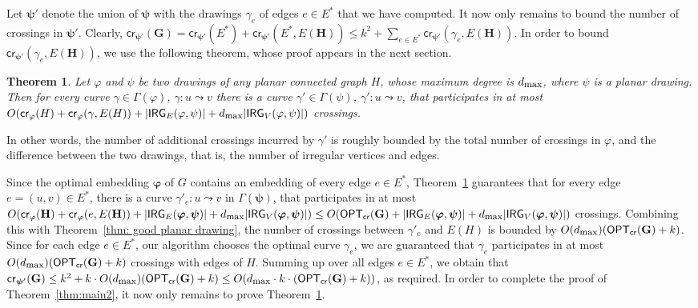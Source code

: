 \documentclass[twoside,leqno,twocolumn]{article}
\newcommand{\connect}{\leadsto}
\newtheorem{theorem}{Theorem}
\renewcommand{\phi}{\varphi}
\newcommand{\optcro}[1]{\mathsf{OPT}_{\mathsf{cr}}(#1)}
\newcommand{\cro}{\mathsf{cr}}
\newcommand{\irreg}{\mathsf{IRG}}
\newcommand{\dmax}{d_{\mbox{\textup{\footnotesize{max}}}}}
\newcommand{\G}{{\mathbf{G}}}
\renewcommand{\H}{{\mathbf{H}}}
\newcommand{\bphi}{{\boldsymbol{\varphi}}}
\newcommand{\bpsi}{{\boldsymbol{\psi}}}
\begin{document}
Let $\bpsi'$ denote the union of $\bpsi$ with the drawings $\gamma_e$ of edges $e\in E^*$ that we have computed. It now only remains to bound the number of crossings in $\bpsi'$. Clearly, $\cro_{\bpsi'}(\G)=\cro_{\bpsi'}(E^*)+\cro_{\bpsi'}(E^*,E(\H))\leq k^2+\sum_{e\in E^*}\cro_{\bpsi'}(\gamma_e,E(\H))$. In order to bound $\cro_{\bpsi'}(\gamma_e,E(\H))$, we use the following theorem, whose proof appears in the next section.

 
\begin{theorem}\label{thm:main-along-path}
Let $\phi$ and $\psi$ be two drawings of any planar connected graph $H$, whose maximum degree is $\dmax$, where $\psi$ is a planar drawing.
Then for every curve $\gamma\in \Gamma(\phi)$, $\gamma:u \connect v$
there is a  curve $\gamma'\in \Gamma(\psi)$, $\gamma':u \connect v$,
that participates in at most $O(\cro_{\phi}(H) + \cro_{\phi}(\gamma, E(H)) + |\irreg_E(\phi,\psi)| + \dmax|\irreg_V(\phi,\psi)|)$ crossings.
\end{theorem}

In other words, the number of additional crossings incurred by $\gamma'$ is roughly bounded by the total number of crossings in $\phi$, and the difference between the two drawings, that is, the number of irregular vertices and edges.

Since the optimal embedding $\bphi$ of $G$ contains an embedding of every edge $e\in E^*$, Theorem~\ref{thm:main-along-path} guarantees that for every edge $e=(u,v)\in E^*$, there is a curve $\gamma'_e:u\connect v$ in $\Gamma(\bpsi)$, that participates in at most $O(\cro_{\phi}(\H)+\cro_{\phi}(e,E(\H))+ |\irreg_E(\bphi,\bpsi)| + \dmax|\irreg_V(\bphi,\bpsi)|)\leq O(\optcro{\G}+|\irreg_E(\bphi,\bpsi)| + \dmax|\irreg_V(\bphi,\bpsi)|)$ crossings. Combining this with Theorem~\ref{thm: good planar drawing}, the number of crossings between $\gamma'_e$ and $E(H)$ is bounded by $O(\dmax)(\optcro{\G} + k)$. 
Since for each edge $e\in E^*$, our algorithm chooses the optimal curve $\gamma_e$, we are guaranteed that $\gamma_e$ participates in at most $O(\dmax)(\optcro{\G} + k)$ crossings with edges of $H$.
Summing up over all edges $e\in E^*$, we obtain that $\cro_{\bpsi'}(\G)\leq k^2+k\cdot O(\dmax)(\optcro{\G} + k)\leq O(\dmax\cdot k\cdot (\optcro{\G}+k))$, as required. In order to complete the proof of Theorem~\ref{thm:main2}, it now only remains to prove Theorem~\ref{thm:main-along-path}.
\end{document}
